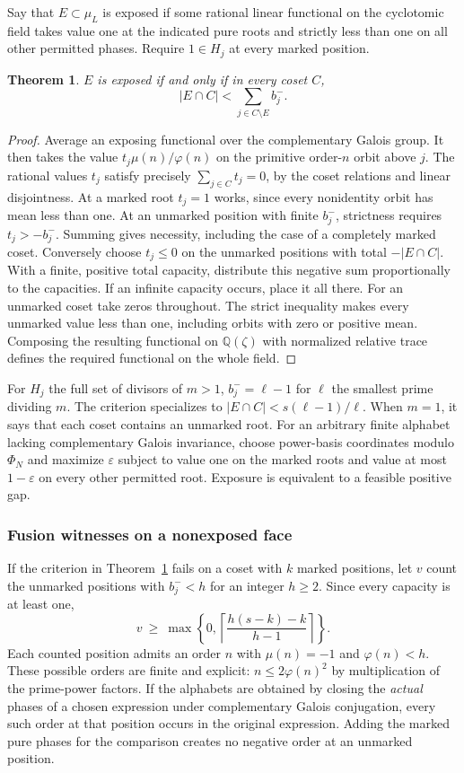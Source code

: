 \documentclass[11pt,a4paper]{article}
\numberwithin{equation}{section}
\newtheorem{theorem}{Theorem}[section]
\theoremstyle{remark}
\newcommand{\QQ}{\mathbb Q}
\begin{document}
Say that $E\subset\mu_L$ is exposed if some rational linear functional
on the cyclotomic field takes value one at the indicated pure roots
and strictly less than one on all other permitted phases. Require
$1\in H_j$ at every marked position.
\begin{theorem}\label{mass:thm:expose}
$E$ is exposed if and only if in every coset $C$,
\[
             |E\cap C| < \sum_{j\in C\setminus E}b_j^- .
\]
\end{theorem}
\begin{proof}
Average an exposing functional over the complementary Galois group.
It then takes the value $t_j\mu(n)/\varphi(n)$ on the primitive
order-$n$ orbit above $j$. The rational values $t_j$ satisfy precisely
$\sum_{j\in C}t_j=0$, by the coset relations and linear disjointness.
At a marked root $t_j=1$ works, since every nonidentity orbit has
mean less than one. At an unmarked position with finite $b_j^-$,
strictness requires $t_j>-b_j^-$. Summing gives necessity, including
the case of a completely marked coset. Conversely choose $t_j\le0$
on the unmarked positions with total $-|E\cap C|$. With a finite,
positive total capacity, distribute this negative sum proportionally
to the capacities. If an infinite capacity occurs, place it all there.
For an unmarked coset take zeros throughout. The strict inequality makes
every unmarked value less than one, including orbits with zero or positive
mean. Composing the resulting functional on $\QQ(\zeta)$ with normalized
relative trace defines the required functional on the whole field.
\end{proof}
For $H_j$ the full set of divisors of $m>1$, $b_j^-=\ell-1$ for
$\ell$ the smallest prime dividing $m$. The criterion specializes to
$|E\cap C|<s(\ell-1)/\ell$. When $m=1$, it says that each coset
contains an unmarked root. For an arbitrary finite alphabet lacking
complementary Galois invariance, choose power-basis coordinates modulo $\Phi_N$ and maximize
$\varepsilon$ subject to value one on the marked roots and value at most
$1-\varepsilon$ on every other permitted root. Exposure is equivalent to a feasible positive gap.

\subsubsection{Fusion witnesses on a nonexposed face}
If the criterion in Theorem~\ref{mass:thm:expose} fails on a coset with
$k$ marked positions, let $v$ count the unmarked positions with
$b_j^-<h$ for an integer $h\ge2$. Since every capacity is at least one,
\begin{equation}\label{mass:witness}
       v\ \ge\ \max\left\{0,\left\lceil
                  \frac{h(s-k)-k}{h-1}\right\rceil\right\}.
\end{equation}
Each counted position admits an order $n$ with $\mu(n)=-1$ and
$\varphi(n)<h$. These possible orders are finite and explicit:
$n\le2\varphi(n)^2$ by multiplication of the prime-power factors.
If the alphabets are obtained by closing the \emph{actual} phases of a
chosen expression under complementary Galois conjugation, every such
order at that position occurs in the original expression. Adding the
marked pure phases for the comparison creates no negative order at
an unmarked position.
\end{document}
